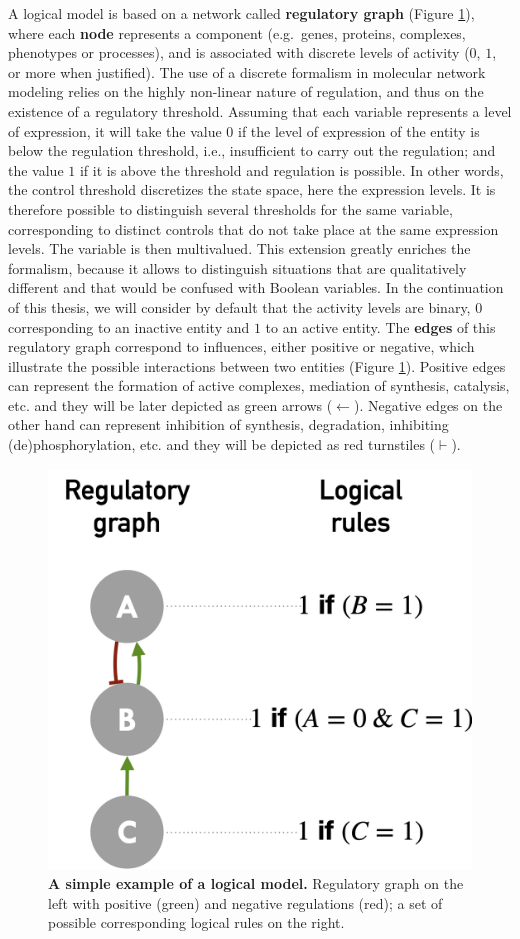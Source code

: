 \documentclass[a4paper,12pt,twoside,onecolumn,openright,final,oldfontcommands]{memoir}
\begin{document}
A logical model is based on a network called \textbf{regulatory graph}
(Figure \ref{fig:logical}), where each \textbf{node} represents a
component (e.g.~genes, proteins, complexes, phenotypes or processes),
and is associated with discrete levels of activity (\(0\), \(1\), or
more when justified). The use of a discrete formalism in molecular
network modeling relies on the highly non-linear nature of regulation,
and thus on the existence of a regulatory threshold. Assuming that each
variable represents a level of expression, it will take the value \(0\)
if the level of expression of the entity is below the regulation
threshold, i.e., insufficient to carry out the regulation; and the value
\(1\) if it is above the threshold and regulation is possible. In other
words, the control threshold discretizes the state space, here the
expression levels. It is therefore possible to distinguish several
thresholds for the same variable, corresponding to distinct controls
that do not take place at the same expression levels. The variable is
then multivalued. This extension greatly enriches the formalism, because
it allows to distinguish situations that are qualitatively different and
that would be confused with Boolean variables. In the continuation of
this thesis, we will consider by default that the activity levels are
binary, \(0\) corresponding to an inactive entity and \(1\) to an active
entity. The \textbf{edges} of this regulatory graph correspond to
influences, either positive or negative, which illustrate the possible
interactions between two entities (Figure \ref{fig:logical}). Positive
edges can represent the formation of active complexes, mediation of
synthesis, catalysis, etc. and they will be later depicted as green
arrows (\(\leftarrow\)). Negative edges on the other hand can represent
inhibition of synthesis, degradation, inhibiting (de)phosphorylation,
etc. and they will be depicted as red turnstiles (\(\vdash\)).

\begin{figure}

{\centering \includegraphics[width=0.5\linewidth]{fig/logical} 

}

\caption[A simple example of a logical model]{\textbf{A simple example of a logical model.}
Regulatory graph on the left with positive (green) and negative
regulations (red); a set of possible corresponding logical rules on the
right.}\label{fig:logical}
\end{figure}
\end{document}
